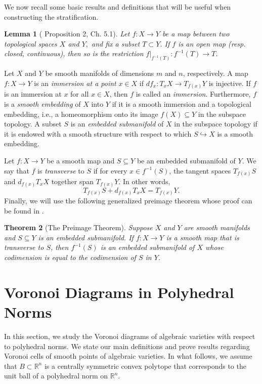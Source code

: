 \documentclass{article}
\newtheorem{theorem}{Theorem}
\numberwithin{theorem}{section}
\newtheorem{lemma}[theorem]{Lemma}
\theoremstyle{definition}
\theoremstyle{example_contd}
\newcommand{\RR}{\mathbb{R}}
\begin{document}
We now recall some basic results and definitions that will be useful when constructing the stratification. 

\begin{lemma}[\cite{bourbaki} Proposition 2, Ch. 5.1]\label{lem:restr_proj}
	Let $f: X\longrightarrow Y$ be a map between two topological spaces $X$ and $Y,$ and fix a subset $T\subset Y$. If $f$ is an open map (resp. closed, continuous), then so is the restriction $f|_{f^{-1}(T)}:f^{-1}(T)\longrightarrow T$. 
\end{lemma}

Let $X$ and $Y$ be smooth manifolds of dimensions $m$ and $n$, respectively. A map $f:X\longrightarrow Y$ is an \textit{immersion at a point} $x\in X$ if $df_x:T_xX\longrightarrow T_{f(x)}Y$ is injective. If $f$ is an immersion at $x$ for all $x\in X$, then $f$ is called an \textit{immersion}. Furthermore, $f$ is a \textit{smooth embedding} of $X$ into $Y$ if it is a smooth immersion and a topological embedding, i.e., a homeomorphism onto its image $f(X)\subseteq Y$ in the subspace topology. A subset $S$ is an \textit{embedded submanifold} of $X$ in the subspace topology if it is endowed with a smooth structure with respect to which $S\hookrightarrow X$ is a smooth embedding.

Let $f:X\to Y$ be a smooth map and $S\subseteq Y$ be an embedded submanifold of $Y$. We say that $f$ is \textit{transverse} to $S$ if for every $x\in f^{-1}(S)$, the tangent spaces $T_{f(x)}S$ and $d_{f(x)}T_xX$ together span $T_{f(x)}Y$. In other words,
 \[T_{f(x)}S+d_{f(x)}T_xX=T_{f(x)}Y.\]
 Finally, we will use the following generalized preimage theorem whose proof can be found in \cite{lee1}.
 
 \begin{theorem}[The Preimage Theorem]\label{thm:preimage_thm} Suppose $X$ and $Y$ are smooth manifolds and $S\subseteq Y$ is an embedded submanifold.
 If $f:X\to Y$ is a smooth map that is transverse to $S$, then $f^{-1}(S)$ is an embedded submanifold of $X$ whose codimension is equal to the codimension of $S$ in $Y$.
 \end{theorem}



\section{Voronoi Diagrams in Polyhedral Norms}\label{sec:VDbasic}


In this section, we study the Voronoi diagrams of algebraic varieties with respect to polyhedral norms. We state our main definitions and prove results regarding Voronoi cells of smooth points of algebraic varieties. In what follows, we assume that $B\subset \RR^n$ is a centrally symmetric convex polytope that corresponds to the unit ball of a polyhedral norm on $\RR^n.$ 
\end{document}
